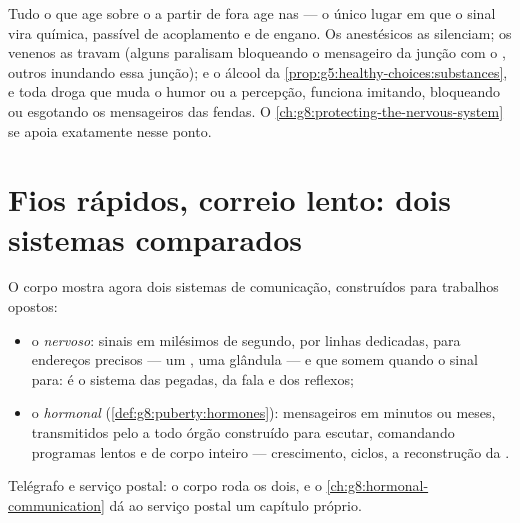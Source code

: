 \begin{remark}\label{rem:g8:nervous-communication:vulnerable}
Tudo o que age sobre o  a partir de fora age nas
 --- o único lugar em que o sinal vira química, passível de
acoplamento e de engano. Os anestésicos as silenciam; os venenos as
travam (alguns paralisam bloqueando o mensageiro da junção com o
, outros inundando essa junção); e o álcool da
\cref{prop:g5:healthy-choices:substances}, e toda droga que muda o
humor ou a percepção, funciona imitando, bloqueando ou esgotando os
mensageiros das fendas. O
\cref{ch:g8:protecting-the-nervous-system} se apoia exatamente nesse
ponto.
\end{remark}

\section{Fios rápidos, correio lento: dois sistemas comparados}

\begin{proposition}\label{prop:g8:nervous-communication:compare}
O corpo mostra agora dois sistemas de comunicação, construídos para
trabalhos opostos:
\begin{itemize}
  \item o \emph{nervoso}: sinais em milésimos de segundo, por linhas
        dedicadas, para endereços precisos --- um , uma glândula
        --- e que somem quando o sinal para: é o sistema das pegadas, da
        fala e dos reflexos;
  \item o \emph{hormonal}
        (\cref{def:g8:puberty:hormones}): mensageiros em minutos ou
        meses, transmitidos pelo  a todo órgão construído para
        escutar, comandando programas lentos e de corpo inteiro ---
        crescimento, ciclos, a reconstrução da .
\end{itemize}
Telégrafo e serviço postal: o corpo roda os dois, e o
\cref{ch:g8:hormonal-communication} dá ao serviço postal um capítulo
próprio.
\end{proposition}
\admitted

